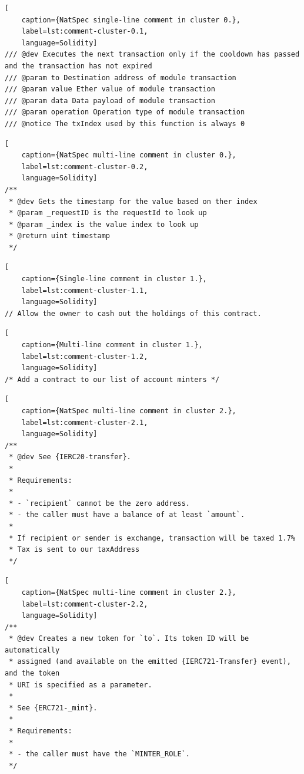 \begin{lstlisting}[
    caption={NatSpec single-line comment in cluster 0.},
    label=lst:comment-cluster-0.1,
    language=Solidity]
/// @dev Executes the next transaction only if the cooldown has passed and the transaction has not expired
/// @param to Destination address of module transaction
/// @param value Ether value of module transaction
/// @param data Data payload of module transaction
/// @param operation Operation type of module transaction
/// @notice The txIndex used by this function is always 0
\end{lstlisting}
\begin{lstlisting}[
    caption={NatSpec multi-line comment in cluster 0.},
    label=lst:comment-cluster-0.2,
    language=Solidity]
/**
 * @dev Gets the timestamp for the value based on ther index
 * @param _requestID is the requestId to look up
 * @param _index is the value index to look up
 * @return uint timestamp
 */   
\end{lstlisting}
\begin{lstlisting}[
    caption={Single-line comment in cluster 1.},
    label=lst:comment-cluster-1.1,
    language=Solidity]
// Allow the owner to cash out the holdings of this contract.
\end{lstlisting}
\begin{lstlisting}[
    caption={Multi-line comment in cluster 1.},
    label=lst:comment-cluster-1.2,
    language=Solidity]
/* Add a contract to our list of account minters */
\end{lstlisting}

\begin{lstlisting}[
    caption={NatSpec multi-line comment in cluster 2.},
    label=lst:comment-cluster-2.1,
    language=Solidity]
/**
 * @dev See {IERC20-transfer}.
 *
 * Requirements:
 *
 * - `recipient` cannot be the zero address.
 * - the caller must have a balance of at least `amount`.
 * 
 * If recipient or sender is exchange, transaction will be taxed 1.7%
 * Tax is sent to our taxAddress
 */
\end{lstlisting}
\begin{lstlisting}[
    caption={NatSpec multi-line comment in cluster 2.},
    label=lst:comment-cluster-2.2,
    language=Solidity]
/**
 * @dev Creates a new token for `to`. Its token ID will be automatically
 * assigned (and available on the emitted {IERC721-Transfer} event), and the token
 * URI is specified as a parameter.
 *
 * See {ERC721-_mint}.
 *
 * Requirements:
 *
 * - the caller must have the `MINTER_ROLE`.
 */   
\end{lstlisting}

